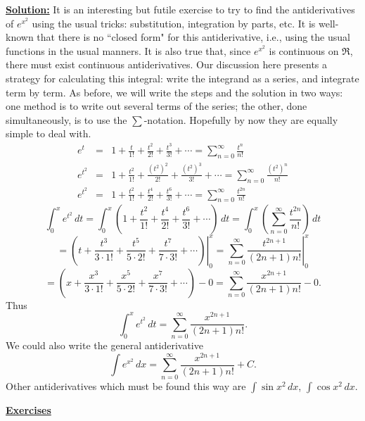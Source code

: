 \underline{\bf Solution:} It is an interesting but futile exercise to try to
find the antiderivatives of $e^{x^2}$ using the usual tricks:
substitution, integration by parts, etc.  It is well-known that
there is no ``closed form" for this antiderivative, i.e., using
the usual functions in the usual manners.  It is also true that,
since $e^{x^2}$ is continuous on $\Re$, there must exist continuous
antiderivatives.\footnotemark
{}
Our discussion here presents a strategy for calculating this
integral:  write the integrand as a series, and integrate term by term.
As before, we will write the steps and the solution in two ways:
one method is to  write out several terms of the series;
the other, done simultaneously, is to use the
$\sum$-notation.  Hopefully by now they are equally
simple to deal with.
\begin{eqnarray*}
e^t&=&1+\frac{t}{1!}+\frac{t^2}{2!}+\frac{t^3}{3!}+\cdots
=\sum_{n=0}^\infty\frac{t^n}{n!}\\
e^{t^2}&=&1+\frac{t^2}{1!}+\frac{(t^2)^2}{2!}+\frac{(t^2)^3}{3!}+\cdots
=\sum_{n=0}^\infty\frac{(t^2)^n}{n!}\\
e^{t^2}&=&1+\frac{t^2}{1!}+\frac{t^4}{2!}+\frac{t^6}{3!}+\cdots
=\sum_{n=0}^\infty\frac{t^{2n}}{n!}\end{eqnarray*} 
$$\int_0^xe^{t^2}\,dt=\int_0^x\left(1+\frac{t^2}{1!}+
	\frac{t^4}{2!}+\frac{t^6}{3!}+\cdots\right)\,dt
=\int_0^x\left(\sum_{n=0}^\infty\frac{t^{2n}}{n!}\right)\,dt$$
$$=\left.\left(t+\frac{t^3}{3\cdot1!}+\frac{t^5}{5\cdot2!}
+\frac{t^7}{7\cdot3!}+\cdots\right)\right|_0^x
=\left.\sum_{n=0}^\infty\frac{t^{2n+1}}{(2n+1)n!}\right|_0^x$$
$$=\left(x+\frac{x^3}{3\cdot1!}+\frac{x^5}{5\cdot2!}
+\frac{x^7}{7\cdot3!}+\cdots\right)-0
=\sum_{n=0}^\infty\frac{x^{2n+1}}{(2n+1)n!}-0.$$
Thus
$$\int_0^xe^{t^2}\,dt=\sum_{n=0}^\infty\frac{x^{2n+1}}{(2n+1)n!}.$$
We could also write the general antiderivative
$$\int e^{x^2}\,dx=\sum_{n=0}^\infty\frac{x^{2n+1}}{(2n+1)n!}+C.$$
\eex
Other antiderivatives which must be found this way are
$\int\sin x^2\,dx$, $\int\cos x^2\,dx$.
\newpage
\begin{center}\underline{\bf\Large Exercises}\end{center} 

